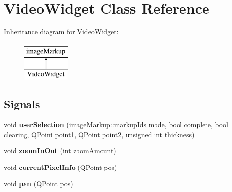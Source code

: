 \hypertarget{classVideoWidget}{
\section{VideoWidget Class Reference}
\label{classVideoWidget}
}
Inheritance diagram for VideoWidget:\begin{figure}[H]
\begin{center}
\leavevmode
\includegraphics[height=2.000000cm]{classVideoWidget}
\end{center}
\end{figure}
\subsection*{Signals}
\begin{DoxyCompactItemize}
\item 
\hypertarget{classVideoWidget_a2f864ca5bb46604f9b6595b770d67cff}{
void {\bfseries userSelection} (imageMarkup::markupIds mode, bool complete, bool clearing, QPoint point1, QPoint point2, unsigned int thickness)}
\label{classVideoWidget_a2f864ca5bb46604f9b6595b770d67cff}

\item 
\hypertarget{classVideoWidget_ac12467eaff0135e50434364a3b05ddbb}{
void {\bfseries zoomInOut} (int zoomAmount)}
\label{classVideoWidget_ac12467eaff0135e50434364a3b05ddbb}

\item 
\hypertarget{classVideoWidget_a2948a5b160135fe6c84e6cdda489f7ae}{
void {\bfseries currentPixelInfo} (QPoint pos)}
\label{classVideoWidget_a2948a5b160135fe6c84e6cdda489f7ae}

\item 
\hypertarget{classVideoWidget_acfb149a4d4a419244bf10b39a6003c6b}{
void {\bfseries pan} (QPoint pos)}
\label{classVideoWidget_acfb149a4d4a419244bf10b39a6003c6b}

\end{DoxyCompactItemize}
